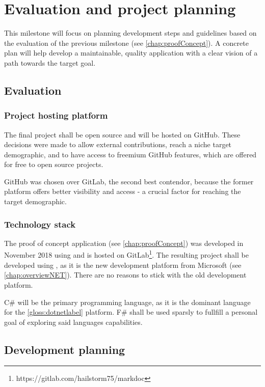 \chapter{Evaluation and project planning} \label{chap:evalProjPlan}

This milestone will focus on planning development steps and guidelines based on the evaluation of the previous milestone (see \ref{chap:proofConcept}).
A concrete plan will help develop a maintainable, quality application with a clear vision of a path towards the target goal.

\section{Evaluation}

\subsection{Project hosting platform}

The final project shall be open source and will be hosted on GitHub.
These decisions were made to allow external contributions, reach a niche target demographic, and to have access to freemium GitHub features, which are offered for free to open source projects.

GitHub was chosen over GitLab, the second best contendor, because the former platform offers better visibility and access - a crucial factor for reaching the target demographic.

\subsection{Technology stack}

The proof of concept application (see \ref{chap:proofConcept}) was developed in November 2018 using  and is hosted on GitLab\footnote{https://gitlab.com/hailstorm75/markdoc}. The resulting project shall be developed using , as it is the new development platform from Microsoft (see \ref{chap:overviewNET}). There are no reasons to stick with the old development platform.

C\# will be the primary programming language, as it is the dominant language for the \ref{gloss:dotnetlabel} platform.
F\# shall be used sparsly to fullfill a personal goal of exploring said languages capabilities.

\section{Development planning}

